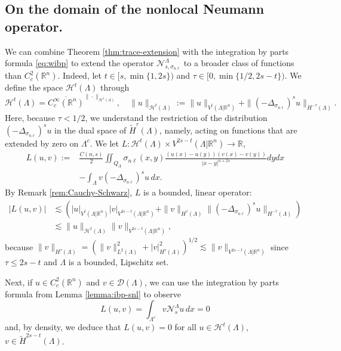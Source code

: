 \documentclass{amsart}
\newcommand{\domain}{\Lambda}
\newcommand{\snl}{{\sigma_{n\ell}}}
\def\R{{\mathbb R}}
\newcommand{\Ns}{\mathcal{N}_s}
\newcommand{\Nsnl}{\mathcal{N}_{s,\snl}}
\theoremstyle{plain}
\numberwithin{equation}{section}
\numberwithin{table}{section}
\numberwithin{figure}{section}
\numberwithin{theorem}{section}
\numberwithin{corollary}{section}
\numberwithin{definition}{section}
\numberwithin{lemma}{section}
\numberwithin{proposition}{section}
\numberwithin{remark}{section}
\begin{document}
\subsection{On the domain of the nonlocal Neumann operator.} \label{sec:domain-Nsnl}
We can combine Theorem \ref{thm:trace-extension} with the integration by parts formula \eqref{eq:wibp} to extend the operator $\Nsnl^\domain$ to a broader class of functions than $C^2_c(\R^n)$.
Indeed, let $t \in [s, \min\{1,2s\})$ and $\tau \in [0, \min\{1/2, 2s - t\} )$. We define the space
$\mathcal{H}^t(\domain)$ through 
\begin{equation}\label{eq:def-calHt}
\mathcal{H}^t(\domain) = \overline{C^\infty_c(\R^n)}^{\| \cdot \|_{\mathcal{H}^t(\domain)}}, \quad
\| u \|_{\mathcal{H}^t(\domain)} := \| u \|_{V^t(\domain | \R^n)} + \| (-\Delta_\snl)^s u \|_{H^{-\tau}(\domain)}.
\end{equation}
Here, because $\tau<1/2$, we understand the restriction of the distribution $(-\Delta_\snl)^s u$ in the dual space of $\widetilde{H}^\tau(\domain)$, namely, acting on functions that are extended by zero on $\domain^c$. 
%
We let $L \colon \mathcal{H}^t(\domain) \times V^{2s-t}(\domain | \R^n) \to \R$,
\begin{equation} \label{eq:def-L} \begin{split} 
L(u,v) := & \frac{C(n,s)}{2} \iint_{Q_\domain}  \snl(x,y) \frac{(u(x)-u(y))(v(x)-v(y))}{|x-y|^{n+2s}} dy dx \\ & - \int_\domain v (-\Delta_\snl)^s u\,dx .
\end{split} 
\end{equation}
By Remark \ref{rem:Cauchy-Schwarz}, $L$ is a bounded, linear operator:
\begin{equation} \label{eq:L-bounded} \begin{split}
|L(u,v)| & \lesssim \left( |u|_{V^t(\domain | \R^n)} |v|_{V^{2s-t}(\domain | \R^n)} + \| v \|_{H^\tau(\domain)}\| (-\Delta_\snl)^s u \|_{H^{-\tau}(\domain)} \right) \\
& \lesssim \|u \|_{\mathcal{H}^t(\domain)} \|v\|_{V^{2s-t}(\domain | \R^n)},
\end{split}\end{equation}
because $\| v \|_{H^\tau(\domain)} = (\| v \|_{L^2(\domain)}^2 + | v |_{H^\tau(\domain)}^2)^{1/2} \lesssim \|v\|_{V^{2s-t}(\domain | \R^n)}$ since $\tau \le 2s-t$ and $\domain$ is a bounded, Lipschitz set.


Next, if $u \in C^2_c(\R^n)$ and $v \in \mathcal{D}(\domain)$, we can use the integration by parts formula from Lemma \ref{lemma:ibp-snl} to observe
\begin{equation} \label{eq:identity-L-vanishes}
L(u,v) =\int_{\domain^c} v \Ns^\domain u\,dx = 0
\end{equation}
and, by density, we deduce that $L(u,v) = 0$ for all $u \in \mathcal{H}^t(\domain)$, $v \in \widetilde{H}^{2s-t}(\domain)$. 
\end{document}
